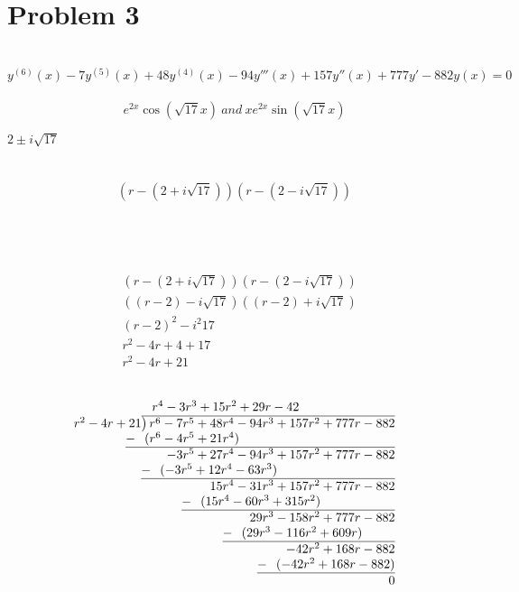 \documentclass{article}
\begin{document}
    \newpage
    \section{Problem 3}
     \\
    $$y^{(6)}(x) -7y^{(5)}(x) + 48y^{(4)}(x) - 94y'''(x) + 157y''(x) + 777y' - 882y(x) = 0$$
     \\
    $$e^{2x}\cos(\sqrt{17}x)\ and\ xe^{2x}\sin{(\sqrt{17}x)}$$

    $2\pm i\sqrt{17}$
     \\ \\
     \\
    $$(r - (2 + i\sqrt{17}))(r - (2 - i\sqrt{17}))$$
     \\ \\ \\
     \\
    \begin{align*}
        &(r - (2 + i\sqrt{17}))(r - (2 - i\sqrt{17})) \\
        &((r - 2) - i\sqrt{17})((r - 2)+ i\sqrt{17}) \\
        &(r - 2)^{2} -i^{2}17\\
        &r^{2} - 4r + 4 + 17\\
        &r^{2} - 4r + 21\\
    \end{align*}
     \\
    \begin{align*}
        \begin{array}{r}
            r^{4} -3r^{3} + 15r^{2} + 29r - 42\phantom{)ddcddddddddddd} \\
            r^{2} - 4r + 21{\overline{\smash{\big)}\, r^{6}-7r^{5}+48r^{4}-94r^{3}+157r^{2}+777r-882}} \\
            \underline{-~\phantom{(}(r^{6} -4r^{5}+21r^{4})\phantom{-bbbbbbbbbbbbbbbbbbbbbbbbbb)}} \\
            -3r^{5} + 27r^{4} - 94r^{3} + 157r^{2} + 777r - 882 \phantom{}\\
            \underline{-~\phantom{(}(-3r^{5} + 12r^{4} - 63r^{3})\phantom{-bbbbbbbbbbbbbbbbbbb)}} \\
            15r^{4} - 31r^{3} + 157r^{2} + 777r - 882 \phantom{}\\
            \underline{-~\phantom{(}(15r^{4} - 60r^{3} + 315r^{2})\phantom{-bbbbbbbbbbb)}} \\
            29r^{3} - 158r^{2} + 777r - 882 \phantom{}\\
            \underline{-~\phantom{(}(29r^{3} - 116r^{2} + 609r)\phantom{-bdbb}} \\
            -42r^{2} + 168r - 882 \phantom{}\\
            \underline{-~\phantom{(}(-42r^{2} + 168r - 882)\phantom{}} \\
            0 \phantom{}\\
        \end{array}
    \end{align*}
\end{document}
